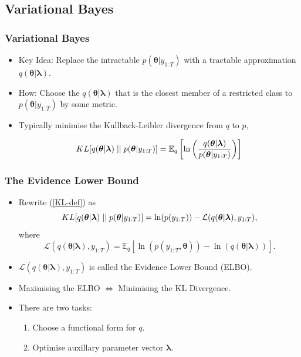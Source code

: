 \documentclass{beamer}\usepackage[]{graphicx}\usepackage[]{color}
\begin{document}
\begin{frame}
\section{Variational Bayes}
\frametitle{Variational Bayes}
\begin{itemize}
\item Key Idea: Replace the intractable $p(\boldsymbol{\theta} | y_{1:T})$ with a tractable approximation $q(\boldsymbol{\theta} | \boldsymbol{\lambda})$.
\item How: Choose the $q(\boldsymbol{\theta} | \boldsymbol{\lambda})$ that is the closest member of a restricted class to $p(\boldsymbol{\theta} | y_{1:T})$ by some metric. 
\item Typically minimise the Kullback-Leibler divergence from $q$ to $p$,

\begin{equation}
\label{KL-def}
KL[q(\boldsymbol{\theta} | \boldsymbol{\lambda})\hspace{.1cm}||\hspace{.1cm}p(\boldsymbol{\theta} | y_{1:T})] = \mathbb{E}_q  \left[ \ln \left( \frac{q(\boldsymbol{\theta} | \boldsymbol{\lambda})}{p(\boldsymbol{\theta} |y_{1:T})}\right) \right]
\end{equation}
\end{itemize}
\end{frame}


\begin{frame}
\frametitle{The Evidence Lower Bound}
\begin{itemize}
\item Rewrite (\ref{KL-def}) as
\begin{equation}
\label{KL-ELBO}
KL[q(\boldsymbol{\theta} | \boldsymbol{\lambda})\hspace{.1cm}||\hspace{.1cm}p(\boldsymbol{\theta} |y_{1:T})] = \ln(p(y_{1:T})) - \mathcal{L}(q(\boldsymbol{\theta} | \boldsymbol{\lambda}), y_{1:T}),
\end{equation}
where
\begin{equation}
\label{ELBO}
\mathcal{L}(q(\boldsymbol{\theta} | \boldsymbol{\lambda}), y_{1:T}) = \mathbb{E}_{q} \left[ \ln (p(y_{1:T},\boldsymbol{\theta})) - \ln (q(\boldsymbol{\theta} | \boldsymbol{\lambda})) \right].
\end{equation}
\item $\mathcal{L}(q(\boldsymbol{\theta} | \boldsymbol{\lambda}), y_{1:T})$ is called the Evidence Lower Bound (ELBO).
\item Maximising the ELBO $\iff$ Minimising the KL Divergence.
\item There are two tasks: 
  \begin{enumerate}
  \item Choose a functional form for $q$. 
  \item Optimise auxillary parameter vector $\boldsymbol{\lambda}$. 
  \end{enumerate}
\end{itemize}
\end{frame}
\end{document}
